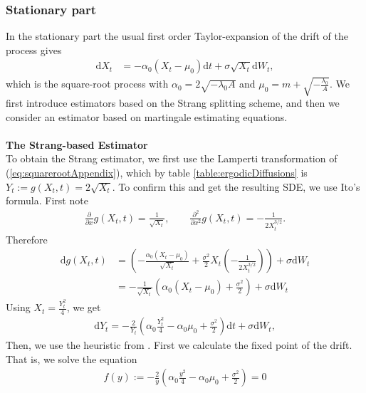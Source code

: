 \subsubsection{Stationary part}\label{subsubsec:squarerootStationary}
In the stationary part the usual first order Taylor-expansion of the drift of the process gives
\begin{align}
    \mathrm{d}X_t &= -\alpha_0\left(X_t - \mu_0\right)\mathrm{d}t + \sigma \sqrt{X_t} \mathrm{d}W_t, \label{eq:squarerootAppendix}
\end{align}
which is the square-root process with $\alpha_0 = 2\sqrt{-\lambda_0A}$ and $\mu_0 = m + \sqrt{-\frac{\lambda_0}{A}}$. 
We first introduce estimators based on the Strang splitting scheme, and then we consider an estimator based on martingale estimating equations.\\\\
\noindent \textbf{The Strang-based Estimator}\\
To obtain the Strang estimator, we first use the Lamperti transformation of (\ref{eq:squarerootAppendix}), which by table \ref{table:ergodicDiffusions} is $Y_t := g(X_t, t) = 2\sqrt{X_t}$. To confirm this and get the resulting SDE, we use Ito's formula. First note
\begin{align}
    \frac{\partial}{\partial x}g(X_t, t) = \frac{1}{\sqrt{X_t}}, \qquad \frac{\partial^2}{\partial x^2}g(X_t, t) = - \frac{1}{2X_t^{3/2}}.
\end{align}
Therefore
\begin{align}
    \mathrm{d}g(X_t, t) &= \left(-\frac{\alpha_0\left(X_t - \mu_0\right)}{\sqrt{X_t}} + \frac{\sigma^2}{2}X_t \left(-\frac{1}{2X_t^{3/2}}\right)\right) + \sigma\mathrm{d}W_t \nonumber \\
    &= -\frac{1}{\sqrt{X_t}}\left(\alpha_0\left(X_t - \mu_0\right) + \frac{\sigma^2}{2}\right) + \sigma\mathrm{d}W_t
\end{align}
Using $X_t = \frac{Y_t^2}{4}$, we get
\begin{align}
    \mathrm{d}Y_t = - \frac{2}{Y_t}\left(\alpha_0 \frac{Y_t^2}{4} - \alpha_0 \mu_0 + \frac{\sigma^2}{2}\right)\mathrm{d}t + \sigma \mathrm{d}W_t, \label{eq:lampertiSquarerootAppendix}
\end{align}
Then, we use the heuristic from \cite[section 2.3 and 2.5]{SplittingSchemes}. First we calculate the fixed point of the drift. That is, we solve the equation
\begin{align}
    f(y) := - \frac{2}{y}\left(\alpha_0 \frac{y^2}{4} - \alpha_0 \mu_0 + \frac{\sigma^2}{2}\right) = 0
\end{align}
